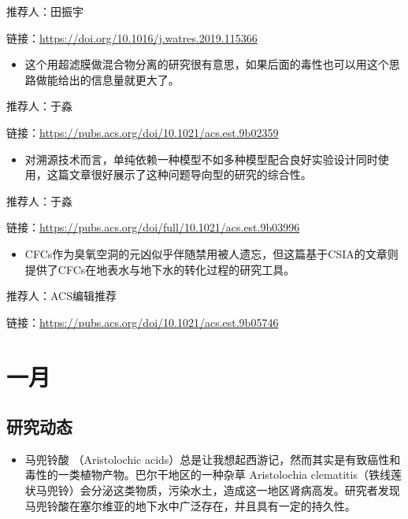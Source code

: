 \documentclass[]{book}
\providecommand{\tightlist}{%
  \setlength{\itemsep}{0pt}\setlength{\parskip}{0pt}}
\begin{document}
推荐人：田振宇

链接：\url{https://doi.org/10.1016/j.watres.2019.115366}

\begin{itemize}
\tightlist
\item
  这个用超滤膜做混合物分离的研究很有意思，如果后面的毒性也可以用这个思路做能给出的信息量就更大了。
\end{itemize}

推荐人：于淼

链接：\url{https://pubs.acs.org/doi/10.1021/acs.est.9b02359}

\begin{itemize}
\tightlist
\item
  对溯源技术而言，单纯依赖一种模型不如多种模型配合良好实验设计同时使用，这篇文章很好展示了这种问题导向型的研究的综合性。
\end{itemize}

推荐人：于淼

链接：\url{https://pubs.acs.org/doi/full/10.1021/acs.est.9b03996}

\begin{itemize}
\tightlist
\item
  CFCs作为臭氧空洞的元凶似乎伴随禁用被人遗忘，但这篇基于CSIA的文章则提供了CFCs在地表水与地下水的转化过程的研究工具。
\end{itemize}

推荐人：ACS编辑推荐

链接：\url{https://pubs.acs.org/doi/10.1021/acs.est.9b05746}

\hypertarget{ux4e00ux6708-2}{%
\section*{一月}\label{ux4e00ux6708-2}}

\hypertarget{ux7814ux7a76ux52a8ux6001-26}{%
\subsection*{研究动态}\label{ux7814ux7a76ux52a8ux6001-26}}

\begin{itemize}
\tightlist
\item
  马兜铃酸 （Aristolochic acids）总是让我想起西游记，然而其实是有致癌性和毒性的一类植物产物。巴尔干地区的一种杂草 Aristolochia clematitis（铁线莲状马兜铃）会分泌这类物质，污染水土，造成这一地区肾病高发。研究者发现马兜铃酸在塞尔维亚的地下水中广泛存在，并且具有一定的持久性。
\end{itemize}
\end{document}
